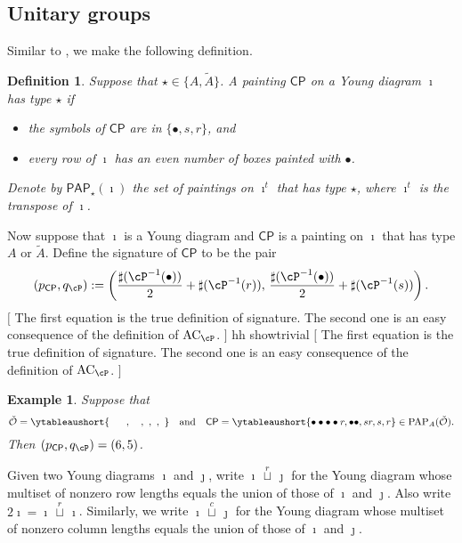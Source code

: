 \documentclass[12pt]{amsart}
\let\ytb=\ytableaushort
\newcommand{\trivial}[2][]{\if\relax\detokenize{#1}\relax
  {%
      \color{orange} \vspace{0em}$[$#2$]$
      \color{black}
  }
  \else
\ifx#1h
\ifcsname showtrivial\endcsname
{%
    \color{orange}\vspace{0em}$[$#2$]$
    \color{black}
}
\fi
\else {\red Wrong argument!} \fi
\fi
}
\newcommand{\AC}{\mathrm{AC}}
\newcommand{\CO}{{\mathcal {O}}}
\newcommand{\CP}{{\mathcal {P}}}
\numberwithin{equation}{section}
\newtheorem{defn}[thm]{Definition}
\newtheorem{eg}[thm]{Example}
\theoremstyle{remark}
\def\ckG{\check{G}}
\def\CP{\mathsf{CP}}
\def\PAP{\mathsf{PAP}}
\def\cuprow{{\stackrel{r}{\sqcup}}}
\def\cupcol{{\stackrel{c}{\sqcup}}}
\def\cuprow{{\,\stackrel{r}{\sqcup}\,}}
\def\cupcol{{\,\stackrel{c}{\sqcup}\,}}
\begin{document}
\subsection{Unitary groups}

Similar to , we make the following definition.

\begin{defn}\label{defpbp1}
  Suppose that $\star\in \{A, \widetilde A\}$. A  painting $\CP$ on a Young diagram $\imath$ has type $\star$ if
  \begin{itemize}
    \item the symbols of $\CP$ are in $\{\bullet, s, r\}$, and
                    \item every row of $\imath$ has an even number of boxes painted with $\bullet$.
  \end{itemize}
  Denote by $\PAP_\star(\imath)$ the set of
 paintings on $\imath^{t}$ that has type $\star$, where $\imath^{t}$
  is the transpose of $\imath$.
   \end{defn}


Now suppose that $\imath$ is a Young diagram and $\CP$ is a painting on $\imath$
that has type $A$ or $\widetilde A$. Define the signature of $\CP$ to be the pair
\begin{equation}\label{eq:signature}
    (p_\CP, q_\cP): = \left (\frac{\sharp(\cP^{-1}(\bullet))}{2}+\sharp(\cP^{-1}(r)),\,
    \frac{ \sharp(\cP^{-1}(\bullet))}{2}+\sharp(\cP^{-1}(s))\right).
\end{equation}
\trivial[h]{ The first equation is the true definition of signature. The second
  one is an easy consequence of the definition of $\AC_\cP$. }

\begin{eg}
  Suppose
  that \[ \check \CO=\ytb{\ \ \ \ \ , \ \ \ , \ , \ , \ }\quad \textrm{and}\quad \CP=\ytb{\bullet\bullet\bullet\bullet r,\bullet\bullet , sr,s,r}\in \mathrm{PAP}_{A}(\check \CO) .
  \]
  Then $(p_\CP, q_\cP)=(6,5)$.

\end{eg}




Given two Young diagrams $\imath$ and $\jmath$, write $\imath\cuprow \jmath$ for
the Young diagram whose multiset of nonzero row lengths equals the union of
those of $\imath$ and $\jmath$. Also write $2\imath =\imath\cuprow \imath$.
Similarly, we write $\imath\cupcol \jmath$ for
the Young diagram whose multiset of nonzero column lengths equals the union of
those of $\imath$ and $\jmath$.
\end{document}
